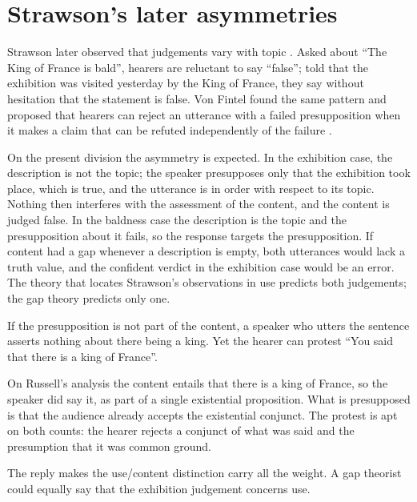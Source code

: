 \documentclass{situationist-preprint}
\begin{document}
\section{Strawson's later asymmetries}

Strawson later observed that judgements vary with topic \citep{Strawson1964}. Asked about \enquote{The King of France is bald}, hearers are reluctant to say \enquote{false}; told that the exhibition was visited yesterday by the King of France, they say without hesitation that the statement is false. Von Fintel found the same pattern and proposed that hearers can reject an utterance with a failed presupposition when it makes a claim that can be refuted independently of the failure \citep{vonFintel2004}.

On the present division the asymmetry is expected. In the exhibition case, the description is not the topic; the speaker presupposes only that the exhibition took place, which is true, and the utterance is in order with respect to its topic. Nothing then interferes with the assessment of the content, and the content is judged false. In the baldness case the description is the topic and the presupposition about it fails, so the response targets the presupposition. If content had a gap whenever a description is empty, both utterances would lack a truth value, and the confident verdict in the exhibition case would be an error. The theory that locates Strawson's observations in use predicts both judgements; the gap theory predicts only one.

\begin{objection}
If the presupposition is not part of the content, a speaker who utters the sentence asserts nothing about there being a king. Yet the hearer can protest \enquote{You said that there is a king of France}.
\end{objection}

\begin{reply}
On Russell's analysis the content entails that there is a king of France, so the speaker did say it, as part of a single existential proposition. What is presupposed is that the audience already accepts the existential conjunct. The protest is apt on both counts: the hearer rejects a conjunct of what was said and the presumption that it was common ground.
\end{reply}

\begin{objection}
The reply makes the use/content distinction carry all the weight. A gap theorist could equally say that the exhibition judgement concerns use.
\end{objection}
\end{document}

